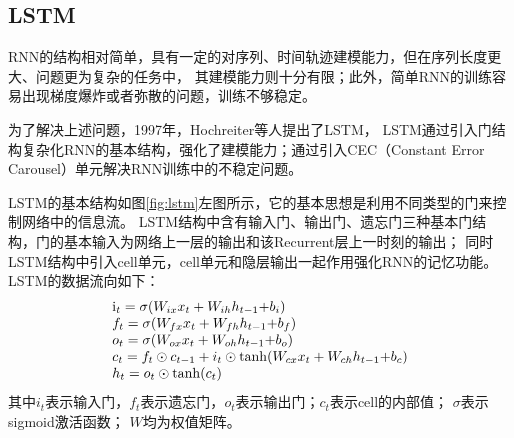\subsection{LSTM}

RNN的结构相对简单，具有一定的对序列、时间轨迹建模能力，但在序列长度更大、问题更为复杂的任务中，
其建模能力则十分有限；此外，简单RNN的训练容易出现梯度爆炸或者弥散的问题，训练不够稳定。

为了解决上述问题，1997年，Hochreiter等人提出了LSTM，
LSTM通过引入门结构复杂化RNN的基本结构，强化了建模能力；通过引入CEC（Constant Error Carousel）单元解决RNN训练中的不稳定问题。


LSTM的基本结构如图\ref{fig:lstm}左图所示，它的基本思想是利用不同类型的门来控制网络中的信息流。
LSTM结构中含有输入门、输出门、遗忘门三种基本门结构，门的基本输入为网络上一层的输出和该Recurrent层上一时刻的输出；
同时LSTM结构中引入cell单元，cell单元和隐层输出一起作用强化RNN的记忆功能。
LSTM的数据流向如下：
\begin{equation}
\begin{array}{l}
{{\rm{i}}_t} = \sigma ({W_{ix}}{x_t} + {W_{ih}}{h_{t - 1}}{\rm{ + }}{b_i})\\
{f_t} = \sigma ({W_{fx}}{x_t} + {W_{fh}}{h_{t - 1}}{\rm{ + }}{b_f})\\
{o_t} = \sigma ({W_{ox}}{x_t} + {W_{oh}}{h_{t - 1}}{\rm{ + }}{b_o})\\
{c_t} = {f_t} \odot {c_{t - 1}} + {i_t} \odot \tanh ({W_{cx}}{x_t} + {W_{ch}}{h_{t - 1}}{\rm{ + }}{b_c})\\
{h_t} = {o_t} \odot \tanh ({c_t})
\end{array}
\end{equation}
其中$i_t$表示输入门，$f_t$表示遗忘门，$o_t$表示输出门；$c_t$表示cell的内部值；
$\sigma$表示sigmoid激活函数；
$W$均为权值矩阵。

